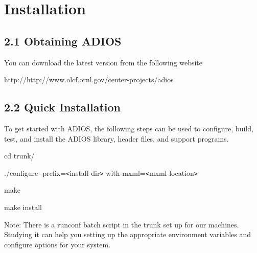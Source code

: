\vspace{22pt}
\section{Installation}

\vspace{24pt}
\subsection*{{\large 2.1 }{\large \textbf{Obtaining ADIOS}}}

\vspace{10pt}
You can download the latest version from the following website 

\vspace{10pt}
http://http://www.olcf.ornl.gov/center-projects/adios\label{HToc84890222}\label{HToc212016597}\label{HToc212016839}\label{HToc182553330}

\vspace{10pt}
\subsection*{{\large 2.2 }{\large \textbf{Quick Installation}}}

\vspace{10pt}
To get started with ADIOS, the following steps can be used to configure, build, 
test, and install the ADIOS library, header files, and support programs. 

\vspace{10pt}
cd trunk/

\vspace{10pt}
./configure -prefix=\texttt{<}install-dir\texttt{>} \-{}\-{}with-mxml=\texttt{<}mxml-location\texttt{>}

\vspace{10pt}
make

\vspace{10pt}
make install

\vspace{10pt}
Note: There is a runconf batch script in the trunk set up for our machines. Studying 
it can help you setting up the appropriate environment variables and configure 
options for your system.\label{HToc84890223}\label{HToc212016598}\label{HToc212016840}\label{HToc182553331}


